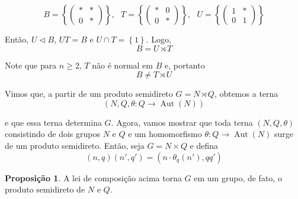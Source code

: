 \documentclass[a4paper,portuguese,11pt,twoside, leqno]{book}
\DeclareMathOperator{\aut}{Aut}
\theoremstyle{definition}
\newtheorem{prop}{Proposição}[section]
\begin{document}
	\begin{equation*}
	B = \left\{ \left(\begin{array}{cc}
	\ast & \ast \\
	0 & \ast 
	\end{array} \right) \right\}, \text{ } T = \left\{ \left(\begin{array}{cc}
	\ast & 0 \\
	0 & \ast 
	\end{array} \right) \right\}, \text{ }U = \left\{ \left(\begin{array}{cc}
	1 & \ast \\
	0 & 1 
	\end{array} \right) \right\}
	\end{equation*}
	\par\vspace{0.3cm} Então, $U\vartriangleleft B$, $UT=B$ e $U\cap T = \left\{1\right\}$. Logo,
	\begin{equation*}
	B = U\rtimes T
	\end{equation*}
	\par\vspace{0.3cm} Note que para $n\geq 2$, $T$ não é normal em $B$ e, portanto
	\begin{equation*}
	B\neq T\rtimes U
	\end{equation*}
	\par\vspace{0.3cm} Vimos que, a partir de um produto semidireto $G = N \rtimes Q$, obtemos a terna
	\begin{equation*}
	(N, Q, \theta:Q\to\aut(N))
	\end{equation*}
	\par\vspace{0.3cm} e que essa terna determina $G$. Agora, vamos mostrar que toda terna $(N,Q,\theta)$ consistindo de dois grupos $N$ e $Q$ e um homomorfismo $\theta:Q\to\aut(N)$ surge de um produto semidireto. Então, seja $G = N\times Q$ e defina
	\begin{equation*}
	(n,q)(n',q') = (n\cdot\theta_q(n'), qq')
	\end{equation*} 
	\begin{prop}
		\label{produto semidireto a partir de grupos}
		A lei de composição acima torna $G$ em um grupo, de fato, o produto semidireto de $N$ e $Q$.
	\end{prop}
\end{document}
